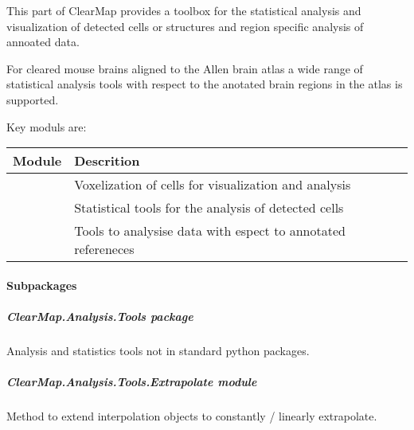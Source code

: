 \documentclass[letterpaper,10pt,english]{sphinxmanual}
\begin{document}
This part of ClearMap provides a toolbox for the statistical analysis and
visualization of detected cells or structures and region specific analysis
of annoated data.

For cleared mouse brains aligned to the Allen brain atlas a wide range of
statistical analysis tools with respect to the anotated brain regions in
the atlas is supported.

Key moduls are:

\begin{tabulary}{\linewidth}{|L|L|}
\hline
\textsf{\relax 
Module
} & \textsf{\relax 
Descrition
}\\
\hline
{}
 & 
Voxelization of cells for visualization and analysis
\\
\hline
{\hyperref[api/ClearMap.Analysis:module-ClearMap.Analysis.Statistics]{\emph{}}}
 & 
Statistical tools for the analysis of detected cells
\\
\hline
{\hyperref[api/ClearMap.Analysis:module-ClearMap.Analysis.Label]{\emph{}}}
 & 
Tools to analysise data with espect to annotated refereneces
\\
\hline\end{tabulary}



\paragraph{Subpackages}
\label{api/ClearMap.Analysis:subpackages}

\subparagraph{ClearMap.Analysis.Tools package}
\label{api/ClearMap.Analysis.Tools:clearmap-analysis-tools-package}\label{api/ClearMap.Analysis.Tools:module-ClearMap.Analysis.Tools}\label{api/ClearMap.Analysis.Tools::doc}
Analysis and statistics tools not in standard python packages.


\subparagraph{ClearMap.Analysis.Tools.Extrapolate module}
\label{api/ClearMap.Analysis.Tools:clearmap-analysis-tools-extrapolate-module}\label{api/ClearMap.Analysis.Tools:module-ClearMap.Analysis.Tools.Extrapolate}
Method to extend interpolation objects to constantly / linearly extrapolate.
\end{document}

